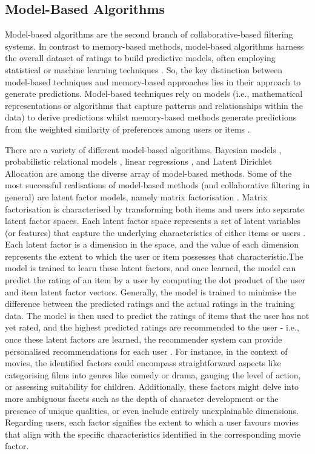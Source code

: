 \subsection{Model-Based Algorithms}
\label{subsec:2 Model-Based Algorithms}

Model-based algorithms are the second branch of collaborative-based filtering systems. In contrast to memory-based methods, model-based algorithms harness the overall dataset of ratings to build predictive models, often employing statistical or machine learning techniques \cite{adomavicius2005toward}. So, the key distinction between model-based techniques and memory-based approaches lies in their approach to generate predictions. Model-based techniques rely on models (i.e., mathematical representations or algorithms that capture patterns and relationships within the data) to derive predictions whilst memory-based methods generate predictions from the weighted similarity of preferences among users or items \cite{adomavicius2005toward}.

There are a variety of different model-based algorithms. Bayesian models \cite{chien1999bayesian}, probabilistic relational models \cite{getoor1999using}, linear regressions \cite{sarwar2001item}, and Latent Dirichlet Allocation \cite{marlin2003modeling} are among the diverse array of model-based methods. Some of the most successful realisations of model-based methods (and collaborative filtering in general) are latent factor models, namely matrix factorisation \cite{koren2009matrix}. Matrix factorisation is characterised by transforming both items and users into separate latent factor spaces. Each latent factor space represents a set of latent variables (or features) that capture the underlying characteristics of either items or users \cite{koren2009matrix}. Each latent factor is a dimension in the space, and the value of each dimension represents the extent to which the user or item possesses that characteristic.The model is trained to learn these latent factors, and once learned, the model can predict the rating of an item by a user by computing the dot product of the user and item latent factor vectors. Generally, the model is trained to minimise the difference between the predicted ratings and the actual ratings in the training data. The model is then used to predict the ratings of items that the user has not yet rated, and the highest predicted ratings are recommended to the user - i.e., once these latent factors are learned, the recommender system can provide personalised recommendations for each user \cite{koren2008factorization}. For instance, in the context of movies, the identified factors could encompass straightforward aspects like categorising films into genres like comedy or drama, gauging the level of action, or assessing suitability for children. Additionally, these factors might delve into more ambiguous facets such as the depth of character development or the presence of unique qualities, or even include entirely unexplainable dimensions. Regarding users, each factor signifies the extent to which a user favours movies that align with the specific characteristics identified in the corresponding movie factor.

